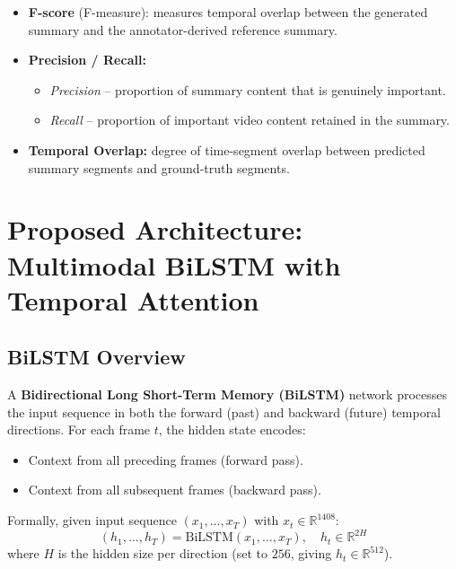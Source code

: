\documentclass[12pt, a4paper]{report}
\begin{document}
\begin{itemize}
  \item \textbf{F-score} (F-measure): measures temporal overlap between the generated
        summary and the annotator-derived reference summary.
  \item \textbf{Precision / Recall:}
        \begin{itemize}
          \item \emph{Precision} -- proportion of summary content that is genuinely important.
          \item \emph{Recall} -- proportion of important video content retained in the summary.
        \end{itemize}
  \item \textbf{Temporal Overlap:} degree of time-segment overlap between predicted
        summary segments and ground-truth segments.
\end{itemize}

\chapter{Proposed Architecture: Multimodal BiLSTM with Temporal Attention}

\section{BiLSTM Overview}

A \textbf{Bidirectional Long Short-Term Memory (BiLSTM)} network \cite{zhang2016}
processes the input sequence in both the forward (past) and backward (future) temporal
directions. For each frame $t$, the hidden state encodes:
\begin{itemize}
  \item Context from all preceding frames (forward pass).
  \item Context from all subsequent frames (backward pass).
\end{itemize}

Formally, given input sequence $(x_1, \dots, x_T)$ with $x_t \in \mathbb{R}^{1408}$:
\begin{equation}
  (h_1, \dots, h_T) = \mathrm{BiLSTM}(x_1, \dots, x_T), \quad h_t \in \mathbb{R}^{2H}
\end{equation}
where $H$ is the hidden size per direction (set to $256$, giving
$h_t \in \mathbb{R}^{512}$).
\end{document}
